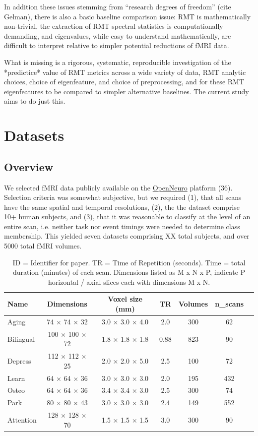\documentclass[12pt]{spieman}  %
\begin{document}
\begin{spacing}{2}
In addition these issues stemming from ``research degrees of freedom'' (cite
Gelman), there is also a basic baseline comparison issue: RMT is mathematically
non-trivial, the extraction of RMT spectral statistics is computationally
demanding, and eigenvalues, while easy to understand mathematically, are
difficult to interpret relative to simpler potential reductions of fMRI data.

What is missing is a rigorous, systematic, reproducible investigation of the
*predictice* value of RMT metrics across a wide variety of data, RMT analytic
choices, choice of eigenfeature, and choice of preprocessing, and for these RMT
eigenfeatures to be compared to simpler alternative baselines. The current
study aims to do just this.


\section{Datasets}
\label{sec:datasets}

\subsection{Overview}

We selected fMRI data publicly available on the
\href{https://openneuro.org/}{OpenNeuro} platform (36). Selection criteria was
somewhat subjective, but we required (1), that all scans have the same spatial
and temporal resolutions, (2), the the dataset comprise 10+ human subjects, and
(3), that it was reasonable to classify at the level of an entire scan, i.e.
neither task nor event timings were needed to determine class membership. This
yielded seven datasets comprising XX total subjects, and over 5000 total fMRI
volumes.


\begin{table}[h!]
\caption{
    ID = Identifier for paper. TR = Time of Repetition (seconds).
    Time = total duration (minutes) of each scan. Dimensions listed as M x N x P,
    indicate P horizontal / axial slices each with dimensions M x N.
}
\label{table:1}
\small
\centering
\begin{tabular}{ l c c c c c c }
\hline
\textbf{Name}    & \textbf{Dimensions}  & \textbf{Voxel size (mm)} & \textbf{TR} & \textbf{Volumes} & \textbf{n\_scans} \\
\hline
Aging     & 74 × 74 × 32   & 3.0 × 3.0 × 4.0 & 2.0  & 300 & 62  \\
Bilingual    & 100 × 100 × 72 & 1.8 × 1.8 × 1.8 & 0.88 & 823 & 90  \\
Depress   & 112 × 112 × 25 & 2.0 × 2.0 × 5.0 & 2.5  & 100 & 72  \\
Learn     & 64 × 64 × 36   & 3.0 × 3.0 × 3.0 & 2.0  & 195 & 432 \\
Osteo     & 64 × 64 × 36   & 3.4 × 3.4 × 3.0 & 2.5  & 300 & 74  \\
Park      & 80 × 80 × 43   & 3.0 × 3.0 × 3.0 & 2.4  & 149 & 552 \\
Attention & 128 × 128 × 70 & 1.5 × 1.5 × 1.5 & 3.0  & 300 & 90  \\
\hline
\end{tabular}
\end{table}


\end{spacing}
\end{document}
